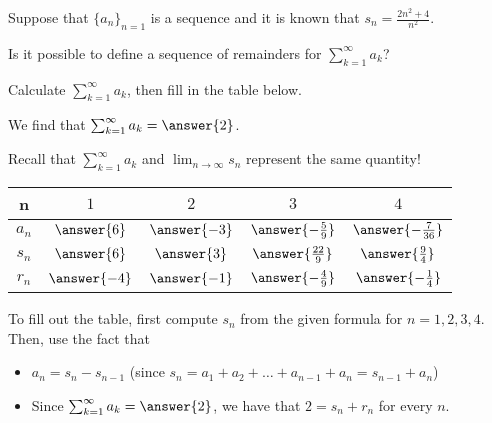 \documentclass{ximera}
\author{Jim Talamo}
\begin{document}
\begin{exercise}

Suppose that $\{a_n\}_{n=1}$ is a sequence and it is known that $s_n = \frac{2n^2+4}{n^2}$.

Is it possible to define a sequence of remainders for $\sum_{k=1}^{\infty} a_k$?

\begin{multipleChoice}
\end{multipleChoice}

\begin{exercise}
Calculate $\sum_{k=1}^{\infty} a_k$, then fill in the table below.

We find that $\sum_{k=1}^{\infty} a_k = \answer{2}$.

\begin{hint}
Recall that $\sum_{k=1}^{\infty} a_k$ and $\lim_{n \to \infty} s_n$ represent the same quantity!
\end{hint}

\begin{center}
\begin{tabular}{c | c | c | c | c }
n& $1$ & $2$ & $3$ & $4$ \\ [2 ex]
\hline
$a_n$ & $ \answer{6}$ &$ \answer{-3}$ & $ \answer{-\frac{5}{9}}$ & $ \answer{-\frac{7}{36}}$  \\ [2 ex]
\hline
$s_n$ & $ \answer{6}$ &$ \answer{3}$ & $ \answer{\frac{22}{9}}$ & $ \answer{\frac{9}{4}}$  \\ [2 ex]
\hline
$r_n$ & $ \answer{-4}$ & $ \answer{-1}$ & $ \answer{-\frac{4}{9}}$ & $ \answer{-\frac{1}{4}}$ 
\end{tabular}
\end{center}

\begin{hint}
To fill out the table, first compute $s_n$ from the given formula for $n=1,2,3,4$.  Then, use the fact that

\begin{itemize}
\item $a_n = s_n-s_{n-1}$ (since $s_n = a_1+a_2+\ldots+a_{n-1}+a_n = s_{n-1}+a_n$)
\item Since  $\sum_{k=1}^{\infty} a_k = \answer{2}$, we have that $2=s_n+r_n$ for every $n$.
\end{itemize}
\end{hint}

\end{exercise}
\end{exercise}
\end{document}
